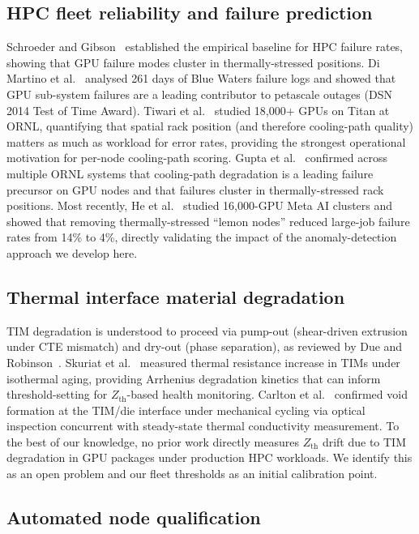 \documentclass[conference]{IEEEtran}
\begin{document}
\subsection{HPC fleet reliability and failure prediction}

Schroeder and Gibson~\cite{schroeder2006} established the empirical
baseline for HPC failure rates, showing that GPU failure modes
cluster in thermally-stressed positions.
Di Martino et al.~\cite{dimartino2014} analysed 261 days of Blue
Waters failure logs and showed that GPU sub-system failures are a
leading contributor to petascale outages (DSN 2014 Test of Time
Award).
Tiwari et al.~\cite{tiwari2015} studied 18,000+ GPUs on Titan at
ORNL, quantifying that spatial rack position (and therefore
cooling-path quality) matters as much as workload for error rates,
providing the strongest operational motivation for per-node
cooling-path scoring.
Gupta et al.~\cite{gupta2017} confirmed across multiple ORNL systems
that cooling-path degradation is a leading failure precursor on GPU
nodes and that failures cluster in thermally-stressed rack positions.
Most recently, He et al.~\cite{he2025} studied 16,000-GPU Meta AI
clusters and showed that removing thermally-stressed ``lemon nodes''
reduced large-job failure rates from 14\% to 4\%, directly validating
the impact of the anomaly-detection approach we develop here.

\subsection{Thermal interface material degradation}

TIM degradation is understood to proceed via pump-out (shear-driven
extrusion under CTE mismatch) and dry-out (phase separation), as
reviewed by Due and Robinson~\cite{due2013}.
Skuriat et al.~\cite{skuriat2013} measured thermal resistance
increase in TIMs under isothermal aging, providing Arrhenius
degradation kinetics that can inform threshold-setting for
$Z_\text{th}$-based health monitoring.
Carlton et al.~\cite{carlton2020} confirmed void formation at the
TIM/die interface under mechanical cycling via optical inspection
concurrent with steady-state thermal conductivity measurement.
To the best of our knowledge, no prior work directly measures
$Z_\text{th}$ drift due to TIM degradation in GPU packages under
production HPC workloads. We identify this as an open problem and
our fleet thresholds as an initial calibration point.

\subsection{Automated node qualification}
\end{document}
